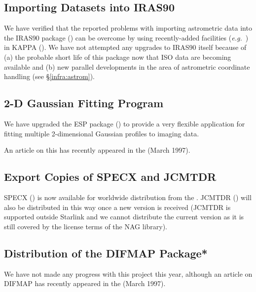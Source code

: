 \subsection{Importing Datasets into IRAS90}

We have verified that the reported problems with importing astrometric
data into the IRAS90 package () can be
overcome by using recently-added facilities
({\em e.g.}\ ) in KAPPA
(). We have not attempted any upgrades to IRAS90
itself because of (a) the probable short life of this package now that
ISO data are becoming available and (b) new parallel developments in
the area of astrometric coordinate handling (see
\S\ref{infra:astrom}).

\subsection{2-D Gaussian Fitting Program}

We have upgraded the ESP package () to provide
a very flexible application for fitting multiple 2-dimensional
Gaussian profiles to imaging data.

An article on this has recently appeared in the
 (March
1997).

\subsection{Export Copies of SPECX and JCMTDR}

SPECX () is now available for worldwide
distribution from the . JCMTDR
() will also be distributed in this way once a
new version is received (JCMTDR is supported outside Starlink and we
cannot distribute the current version as it is still covered by the
license terms of the NAG library).

\subsection{Distribution of the DIFMAP Package*}

We have not made any progress with this project this year, although an
article on DIFMAP has recently appeared in the
 (March
1997).

